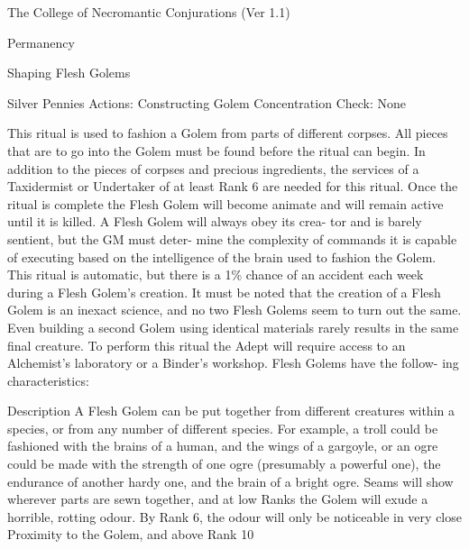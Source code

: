\begin{Chapter}{The College of Necromantic Conjurations (Ver 1.1)}
\begin{ritual}[R-3]{Permanency }
\begin{effects}
\end{effects}
\end{ritual}

\begin{ritual}[R-4]{Shaping Flesh Golems }

Silver Pennies 
Actions: Constructing Golem 
Concentration Check: None 
\begin{effects}
This ritual is used to fashion a Golem from 
parts of different corpses. All pieces that are to go 
into the Golem must be found before the ritual can 
begin.  In  addition  to  the  pieces  of  corpses  and 
precious  ingredients,  the  services  of  a  Taxidermist 
or Undertaker of at least Rank 6 are needed for this 
ritual. Once the ritual is complete the Flesh Golem 
will become animate and will remain active until it 
is killed. A Flesh Golem will always obey its crea-
tor  and  is  barely  sentient,  but  the  GM  must  deter-
mine the complexity of commands it is capable of 
executing  based  on  the  intelligence  of  the  brain 
used to fashion the Golem. This ritual is automatic, 
but there is a 1\% chance of an accident each week 
during  a  Flesh  Golem’s  creation.  It  must be  noted 
that  the  creation  of  a  Flesh  Golem  is  an  inexact 
science, and no two Flesh Golems seem to turn out 
the  same.  Even  building  a  second  Golem  using 
identical  materials  rarely  results  in  the  same  final 
creature.  To  perform  this  ritual  the  Adept  will 
require  access  to  an  Alchemist’s  laboratory  or  a 
Binder’s workshop. Flesh Golems have the follow-
ing characteristics: 

Description A Flesh Golem can be put together 
from different creatures within a species, or from 
any number of different species. For example, a 
troll could be fashioned with the brains of a human, 
and the wings of a gargoyle, or an ogre could be 
made with the strength of one ogre (presumably a 
powerful one), the endurance of another hardy one, 
and the brain of a bright ogre. Seams will show 
wherever parts are sewn together, and at low Ranks 
the Golem will exude a horrible, rotting odour. By 
Rank 6, the odour will only be noticeable in very 
close Proximity to the Golem, and above Rank 10 


\end{effects}
\end{ritual}
\end{Chapter}
